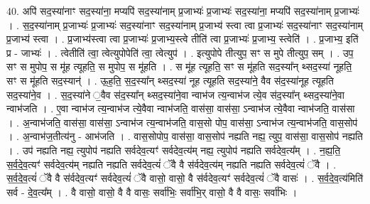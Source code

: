 \documentclass[17pt]{extarticle}
\begin{document}
40. अपि॑ सद॒स्या॑नाꣳ सद॒स्या॑ना॒ मप्यपि॑ सद॒स्या॑नाम् प्र॒जाभ्यः॑ प्र॒जाभ्यः॑ सद॒स्या॑ना॒ मप्यपि॑ सद॒स्या॑नाम् प्र॒जाभ्यः॑ । . स॒द॒स्या॑नाम् प्र॒जाभ्यः॑ प्र॒जाभ्यः॑ सद॒स्या॑नाꣳ सद॒स्या॑नाम् प्र॒जाभ्य॑ स्त्वा त्वा प्र॒जाभ्यः॑ सद॒स्या॑नाꣳ सद॒स्या॑नाम् प्र॒जाभ्य॑ स्त्वा । . प्र॒जाभ्य॑स्त्वा त्वा प्र॒जाभ्यः॑ प्र॒जाभ्य॒स्त्वे तीति॑ त्वा प्र॒जाभ्यः॑ प्र॒जाभ्य॒ स्त्वेति॑ । . प्र॒जाभ्य॒ इति॑ प्र - जाभ्यः॑ । . त्वेतीति॑ त्वा॒ त्वेत्युपोपेति॑ त्वा॒ त्वेत्युप॑ । . इत्युपोपे तीत्युप॒ सꣳ स मुपे तीत्युप॒ सम् । . उप॒ सꣳ स मुपोप॒ स मू॑ह त्यूहति॒ स मुपोप॒ स मू॑हति । . स मू॑ह त्यूहति॒ सꣳ स मू॑हति सद॒स्या᳚न् थ्सद॒स्या॑ नूहति॒ सꣳ स मू॑हति सद॒स्यान्॑ । . ऊ॒ह॒ति॒ स॒द॒स्या᳚न् थ्सद॒स्या॑ नूह त्यूहति सद॒स्या॑ने॒ वैव स॑द॒स्या॑नूह त्यूहति सद॒स्या॑ने॒व । . स॒द॒स्या॑ने ॒वैव स॑द॒स्या᳚न् थ्सद॒स्या॑ने॒वा न्वाभ॑ज त्य॒न्वाभ॑ज त्ये॒व स॑द॒स्या᳚न् थ्सद॒स्या॑ने॒वा न्वाभ॑जति । . ए॒वा न्वाभ॑ज त्य॒न्वाभ॑ज त्ये॒वैवा न्वाभ॑जति॒ वास॑सा॒ वास॑सा॒ ऽन्वाभ॑ज त्ये॒वैवा न्वाभ॑जति॒ वास॑सा । . अ॒न्वाभ॑जति॒ वास॑सा॒ वास॑सा॒ ऽन्वाभ॑ज त्य॒न्वाभ॑जति॒ वास॒सो पोप॒ वास॑सा॒ ऽन्वाभ॑ज त्य॒न्वाभ॑जति॒ वास॒सोप॑ । . अ॒न्वाभ॑ज॒तीत्य॑नु - आभ॑जति । . वास॒सोपोप॒ वास॑सा॒ वास॒सोप॑ नह्यति नह्य॒ त्युप॒ वास॑सा॒ वास॒सोप॑ नह्यति । . उप॑ नह्यति नह्य॒ त्युपोप॑ नह्यति सर्वदेव॒त्यꣳ॑ सर्वदेव॒त्य॑म् नह्य॒ त्युपोप॑ नह्यति सर्वदेव॒त्य᳚म् । . न॒ह्य॒ति॒ स॒र्व॒दे॒व॒त्यꣳ॑ सर्वदेव॒त्य॑म् नह्यति नह्यति सर्वदेव॒त्यं॑ ॅवै वै स॑र्वदेव॒त्य॑म् नह्यति नह्यति सर्वदेव॒त्यं॑ ॅवै । . स॒र्व॒दे॒व॒त्यं॑ ॅवै वै स॑र्वदेव॒त्यꣳ॑ सर्वदेव॒त्यं॑ ॅवै वासो॒ वासो॒ वै स॑र्वदेव॒त्यꣳ॑ सर्वदेव॒त्यं॑ ॅवै वासः॑ । . स॒र्व॒दे॒व॒त्य॑मिति॑ सर्व - दे॒व॒त्य᳚म् । . वै वासो॒ वासो॒ वै वै वासः॒ सर्वा॑भिः॒ सर्वा॑भि॒र् वासो॒ वै वै वासः॒ सर्वा॑भिः । \newline
\pagebreak
{}
\end{document}
